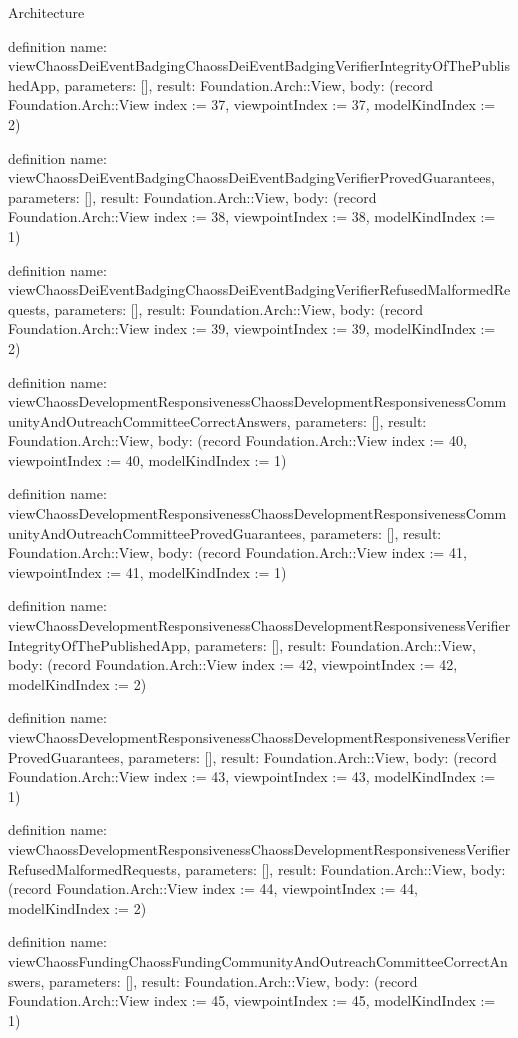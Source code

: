 \begin{lexlean}{Architecture}
\begin{semanticmodule}
definition{
  name: viewChaossDeiEventBadgingChaossDeiEventBadgingVerifierIntegrityOfThePublishedApp,
  parameters: [],
  result: Foundation.Arch::View,
  body: (record Foundation.Arch::View {index := 37, viewpointIndex := 37, modelKindIndex := 2})
}

definition{
  name: viewChaossDeiEventBadgingChaossDeiEventBadgingVerifierProvedGuarantees,
  parameters: [],
  result: Foundation.Arch::View,
  body: (record Foundation.Arch::View {index := 38, viewpointIndex := 38, modelKindIndex := 1})
}

definition{
  name: viewChaossDeiEventBadgingChaossDeiEventBadgingVerifierRefusedMalformedRequests,
  parameters: [],
  result: Foundation.Arch::View,
  body: (record Foundation.Arch::View {index := 39, viewpointIndex := 39, modelKindIndex := 2})
}

definition{
  name: viewChaossDevelopmentResponsivenessChaossDevelopmentResponsivenessCommunityAndOutreachCommitteeCorrectAnswers,
  parameters: [],
  result: Foundation.Arch::View,
  body: (record Foundation.Arch::View {index := 40, viewpointIndex := 40, modelKindIndex := 1})
}

definition{
  name: viewChaossDevelopmentResponsivenessChaossDevelopmentResponsivenessCommunityAndOutreachCommitteeProvedGuarantees,
  parameters: [],
  result: Foundation.Arch::View,
  body: (record Foundation.Arch::View {index := 41, viewpointIndex := 41, modelKindIndex := 1})
}

definition{
  name: viewChaossDevelopmentResponsivenessChaossDevelopmentResponsivenessVerifierIntegrityOfThePublishedApp,
  parameters: [],
  result: Foundation.Arch::View,
  body: (record Foundation.Arch::View {index := 42, viewpointIndex := 42, modelKindIndex := 2})
}

definition{
  name: viewChaossDevelopmentResponsivenessChaossDevelopmentResponsivenessVerifierProvedGuarantees,
  parameters: [],
  result: Foundation.Arch::View,
  body: (record Foundation.Arch::View {index := 43, viewpointIndex := 43, modelKindIndex := 1})
}

definition{
  name: viewChaossDevelopmentResponsivenessChaossDevelopmentResponsivenessVerifierRefusedMalformedRequests,
  parameters: [],
  result: Foundation.Arch::View,
  body: (record Foundation.Arch::View {index := 44, viewpointIndex := 44, modelKindIndex := 2})
}

definition{
  name: viewChaossFundingChaossFundingCommunityAndOutreachCommitteeCorrectAnswers,
  parameters: [],
  result: Foundation.Arch::View,
  body: (record Foundation.Arch::View {index := 45, viewpointIndex := 45, modelKindIndex := 1})
}


\end{semanticmodule}
\end{lexlean}
